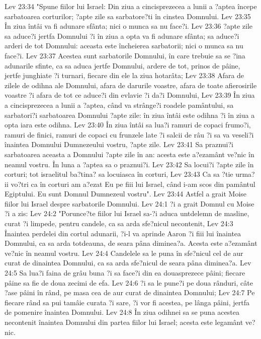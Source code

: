 Lev 23:34  "Spune fiilor lui Israel: Din ziua a cincisprezecea a lunii a ?aptea începe sarbatoarea corturilor; ?apte zile sa sarbatore?ti în cinstea Domnului.
Lev 23:35  În ziua întâi va fi adunare sfânta; nici o munca sa nu face?i.
Lev 23:36  ?apte zile sa aduce?i jertfa Domnului ?i în ziua a opta va fi adunare sfânta; sa aduce?i arderi de tot Domnului: aceasta este încheierea sarbatorii; nici o munca sa nu face?i.
Lev 23:37  Acestea sunt sarbatorile Domnului, în care trebuie sa se ?ina adunarile sfinte, ca sa aduca jertfe Domnului, ardere de tot, prinos de pâine, jertfe junghiate ?i turnari, fiecare din ele la ziua hotarâta;
Lev 23:38  Afara de zilele de odihna ale Domnului, afara de darurile voastre, afara de toate afierosirile voastre ?i afara de tot ce aduce?i din evlavie ?i da?i Domnului,
Lev 23:39  În ziua a cincisprezecea a lunii a ?aptea, când va strânge?i roadele pamântului, sa sarbatori?i sarbatoarea Domnului ?apte zile: în ziua întâi este odihna ?i în ziua a opta iara este odihna.
Lev 23:40  În ziua întâi sa lua?i ramuri de copaci frumo?i, ramuri de finici, ramuri de copaci cu frunzele late ?i salcii de râu ?i sa va veseli?i înaintea Domnului Dumnezeului vostru, ?apte zile.
Lev 23:41  Sa praznui?i sarbatoarea aceasta a Domnului ?apte zile în an: acesta este a?ezamânt ve?nic în neamul vostru. În luna a ?aptea sa o praznui?i.
Lev 23:42  Sa locui?i ?apte zile în corturi; tot israelitul ba?tina? sa locuiasca în corturi,
Lev 23:43  Ca sa ?tie urma?ii vo?tri ca în corturi am a?ezat Eu pe fiii lui Israel, când i-am scos din pamântul Egiptului. Eu sunt Domnul Dumnezeul vostru".
Lev 23:44  Astfel a grait Moise fiilor lui Israel despre sarbatorile Domnului.
Lev 24:1  ?i a grait Domnul cu Moise ?i a zis:
Lev 24:2  "Porunce?te fiilor lui Israel sa-?i aduca untdelemn de masline, curat ?i limpede, pentru candele, ca sa arda sfe?nicul necontenit,
Lev 24:3  Înaintea perdelei din cortul adunarii, ?i-l va aprinde Aaron ?i fiii lui înaintea Domnului, ca sa arda totdeauna, de seara pâna diminea?a. Acesta este a?ezamânt ve?nic în neamul vostru.
Lev 24:4  Candelele sa le puna în sfe?nicul cel de aur curat de dinaintea Domnului, ca sa arda sfe?nicul de seara pâna diminea?a.
Lev 24:5  Sa lua?i faina de grâu buna ?i sa face?i din ea douasprezece pâini; fiecare pâine sa fie de doua zecimi de efa.
Lev 24:6  ?i sa le pune?i pe doua rânduri, câte ?ase pâini în rând, pe masa cea de aur curat de dinaintea Domnului;
Lev 24:7  Pe fiecare rând sa pui tamâie curata ?i sare, ?i vor fi acestea, pe lânga pâini, jertfa de pomenire înaintea Domnului.
Lev 24:8  În ziua odihnei sa se puna acestea necontenit înaintea Domnului din partea fiilor lui Israel; acesta este legamânt ve?nic.
